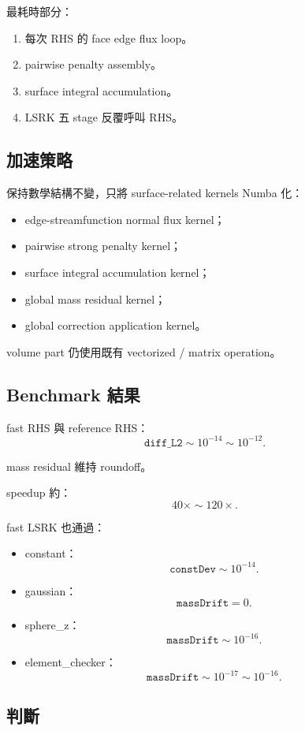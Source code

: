 \documentclass[UTF8,12pt,a4paper]{ctexart}
\begin{document}
最耗時部分：
\begin{enumerate}
  \item 每次 RHS 的 face edge flux loop。
  \item pairwise penalty assembly。
  \item surface integral accumulation。
  \item LSRK 五 stage 反覆呼叫 RHS。
\end{enumerate}

\subsection{加速策略}

保持數學結構不變，只將 surface-related kernels Numba 化：
\begin{itemize}
  \item edge-streamfunction normal flux kernel；
  \item pairwise strong penalty kernel；
  \item surface integral accumulation kernel；
  \item global mass residual kernel；
  \item global correction application kernel。
\end{itemize}

volume part 仍使用既有 vectorized / matrix operation。

\subsection{Benchmark 結果}

fast RHS 與 reference RHS：
\[
\texttt{diff\_L2}\sim10^{-14}\sim10^{-12}.
\]

mass residual 維持 roundoff。

speedup 約：
\[
40\times\sim120\times.
\]

fast LSRK 也通過：
\begin{itemize}
  \item constant：
  \[
  \texttt{constDev}\sim10^{-14}.
  \]
  \item gaussian：
  \[
  \texttt{massDrift}=0.
  \]
  \item sphere\_z：
  \[
  \texttt{massDrift}\sim10^{-16}.
  \]
  \item element\_checker：
  \[
  \texttt{massDrift}\sim10^{-17}\sim10^{-16}.
  \]
\end{itemize}

\subsection{判斷}
\end{document}
